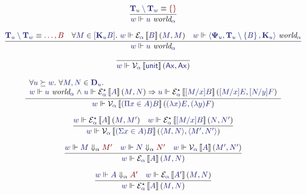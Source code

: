 \documentclass[11pt]{amsart}
\theoremstyle{definition}
\theoremstyle{remark}
\numberwithin{equation}{section}
\def\InputModeColorName{MidnightBlue}
\def\OutputModeColorName{Maroon}
\newcommand\IMode[1]{{\color{\InputModeColorName}{#1}}}
\newcommand\OMode[1]{{\color{\OutputModeColorName}{#1}}}
\newcommand\Sem[1]{\left\llbracket \IMode{#1}\right\rrbracket}
\newcommand\Force[2]{\IMode{#1}\Vdash #2}
\newcommand\IsWorld[2]{\IMode{#1}\ \textit{world}_\IMode{#2}}
\newcommand\Match[2]{\IMode{#1}\equiv\OMode{#2}}
\newcommand\Val[2]{\mathcal{V}_{\IMode{#1}}\Sem{#2}}
\newcommand\IsVal[4]{\Val{#1}{#2}\left(\IMode{#3},\IMode{#4}\right)}
\newcommand\Exp[2]{\mathcal{E}_{\IMode{#1}}\Sem{#2}}
\newcommand\ExpStar[2]{\mathcal{E}_{\IMode{#1}}^\star\Sem{#2}}
\newcommand\IsExp[4]{\Exp{#1}{#2}\left(\IMode{#3},\IMode{#4}\right)}
\newcommand\IsExpStar[4]{\ExpStar{#1}{#2}\left(\IMode{#3},\IMode{#4}\right)}
\newcommand\SetLit[1]{\left\{#1\right\}}
\newcommand\Sig[1]{\mathbf{\Psi}_{#1}}
\newcommand\TyUnit{\mathsf{unit}}
\newcommand\TyDFun[3]{(\Pi #2 \in #1)#3}
\newcommand\TyDProd[3]{(\Sigma #2 \in #1)#3}
\newcommand\Ax{\mathsf{Ax}}
\newcommand\SuccEq[2]{\IMode{#1}\succeq\IMode{#2}}
\newcommand\Pair[2]{\left\langle #1, #2 \right\rangle}
\newcommand\Lam[2]{(\lambda #1)#2}
\newcommand\Member[2]{\IMode{#1} \in \IMode{#2}}
\newcommand\Eval[3]{\IMode{#2}\Downarrow_{#1}\OMode{#3}}
\newcommand\MkWorld[3]{\left\langle #1, #2, #3\right\rangle}
\newcommand\Ext[1]{\left[#1\right]}
\newcommand\Dom[1]{\mathbf{D}_{#1}}
\newcommand\Types[1]{\mathbf{T}_{#1}}
\newcommand\Witnesses[1]{\mathbf{K}_{#1}}
\begin{document}
\begin{gather*}
  \infer{
    \Force{w}{\IsWorld{u}{\alpha}}
  }{
    \Match{\Types{u}\setminus\Types{w}}{\SetLit{}}
  }\\[6pt]
  \infer{
    \Force{w}{\IsWorld{u}{\alpha}}
  }{
    \Match{\Types{u}\setminus\Types{w}}{\dots, B} &
    \forall\Member{M}{\Ext{\Witnesses{u}B}}.\ \Force{w}{\IsExp{\alpha}{B}{M}{M}} &
    \Force{w}{\IsWorld{\MkWorld{\Sig{u}}{\Types{u}\setminus\SetLit{B}}{\Witnesses{u}}}{\alpha}}
  }\\[6pt]
  \infer{
    \Force{w}{\IsVal{\alpha}{\TyUnit}{\Ax}{\Ax}}
  }{
  }\\[6pt]
  \infer{
    \Force{w}{\IsVal{\alpha}{\TyDFun{A}{x}{B}}{\Lam{x}{E}}{\Lam{y}{F}}}
  }{
    \begin{array}{l}
      \forall\SuccEq{u}{w}.\ \forall\Member{M,N}{\Dom{u}}.\\
      \Force{w}{\IsWorld{u}{\alpha}} \mathrel\land
      \Force{u}{\IsExpStar{\alpha}{A}{M}{N}} \Rightarrow
      \Force{u}{\IsExpStar{\alpha}{[M/x]B}{[M/x]E}{[N/y]F}}
    \end{array}
  }\\[6pt]
  \infer{
    \Force{w}{\IsVal{\alpha}{\TyDProd{A}{x}{B}}{\Pair{M}{N}}{\Pair{M'}{N'}}}
  }{
    \Force{w}{\IsExpStar{\alpha}{A}{M}{M'}} &
    \Force{w}{\IsExpStar{\alpha}{[M/x]B}{N}{N'}}
  }\\[6pt]
  \infer{
    \Force{w}{\IsExp{\alpha}{A}{M}{N}}
  }{
    \Force{w}{\Eval{\alpha}{M}{M'}} &
    \Force{w}{\Eval{\alpha}{N}{N'}} &
    \Force{w}{\IsVal{\alpha}{A}{M'}{N'}}
  }\\[6pt]
  \infer{
    \Force{w}{\IsExpStar{\alpha}{A}{M}{N}}
  }{
    \Force{w}{\Eval{\alpha}{A}{A'}} &
    \Force{w}{\IsExp{\alpha}{A'}{M}{N}}
  }
\end{gather*}
\end{document}
